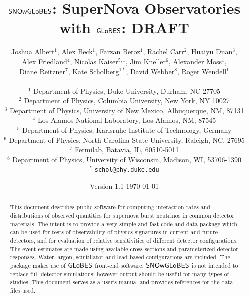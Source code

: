 \documentclass[12pt]{article}
\newcommand{\globes}{\sf{GLoBES}}
\newcommand{\snowglobes}{\sf{SNOwGLoBES}}
\begin{document}
\title{\bf $\snowglobes$: SuperNova Observatories with $\globes$: DRAFT}
\author{Joshua Albert$^1$,
Alex Beck$^1$,
Farzan Beroz$^1$,
Rachel Carr$^2$,
Huaiyu Duan$^3$,\\
Alex Friedland$^4$,
Nicolas Kaiser$^{5,1}$,
Jim Kneller$^6$,
Alexander Moss$^1$,\\
Diane Reitzner$^7$,
Kate Scholberg$^{1*}$,
David Webber$^8$,
Roger Wendell$^1$\\
~\\
\small
$^1$ Department of Physics, Duke University, Durham, NC 27705\\
\small
$^2$ Department of Physics, Columbia University, New York, NY 10027\\
\small
$^3$ Department of Physics, University of New Mexico, Albuquerque, NM, 87131\\
\small
$^4$ Los Alamos National Laboratory, Los Alamos, NM, 87545\\
\small
$^5$ Department of Physics, Karlsruhe Institute of Technology, Germany\\
\small
$^6$ Department of Physics, North Carolina State University, Raleigh, NC,  27695\\
\small
$^7$ Fermilab, Batavia, IL, 60510-5011\\
\small
$^8$ Department of Physics, University of Wisconsin, Madison, WI, 53706-1390\\
\small
$^*$ \texttt{schol@phy.duke.edu}\\
}

\date{Version 1.1 \today}

\maketitle 


\begin{abstract} 
This document describes public software
  for computing interaction rates and distributions of observed
  quantities for supernova burst neutrinos in common detector
  materials.  The intent is to provide a very simple and fast 
  code and data
  package which
  can be used for tests of observability of physics signatures in
  current and future detectors, and for evaluation of relative
  sensitivities of different detector configurations.  The event
  estimates are made using available cross-sections and
  parameterized detector responses.  Water, argon, scintillator
  and lead-based configurations are included.
  The package makes use of $\globes$
  front-end software.  $\snowglobes$ is not intended to replace full
  detector simulations; however output should be useful for many types
  of studies.  This document serves as a user's manual and provides 
  references for the data files used.

\end{abstract}
\end{document}
